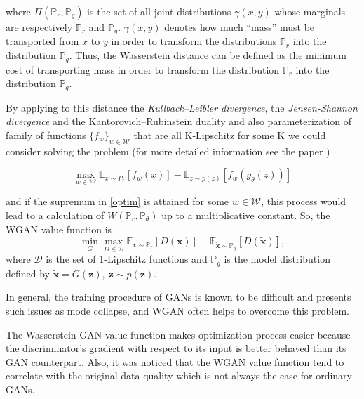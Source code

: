 \documentclass{webofc}
\newcommand{\vx}{\ensuremath{\mathbf{x}}}
\newcommand{\vz}{\ensuremath{\mathbf{z}}}
\begin{document}
where $\Pi(\mathbb{P}_r, \mathbb{P}_g)$ is the set of all joint distributions $\gamma(x, y)$ whose marginals are respectively $\mathbb{P}_r$ and $\mathbb{P}_g$. $\gamma(x, y)$ denotes how much “mass” must be transported from $x$ to $y$ in order to transform the distributions $\mathbb{P}_r$ into the distribution $\mathbb{P}_g$. Thus, the Wasserstein distance can be defined as the minimum cost of transporting mass in order to transform the distribution $\mathbb{P}_r$ into the distribution $\mathbb{P}_q$. 

By applying to this distance the \emph{Kullback--Leibler divergence}, the \emph{Jensen-Shannon divergence} and the Kantorovich--Rubinstein duality and also parameterization of family of functions $\{f_w\}_{w \in \mathcal{W}}$ that are all K-Lipschitz for some K we could consider solving the problem (for more detailed information see the paper \cite{arjovsky2017wasserstein})

\begin{equation}\label{optim}
\max_{w \in \mathcal{W}} \mathbb{E}_{x \sim P_r}[f_w(x)] - \mathbb{E}_{z\sim p(z)} [f_w(g_\theta(z))]
\end{equation}

and if the supremum in \eqref{optim} is attained for some $w \in \mathcal{W}$, this process would lead to a calculation of $W(\mathbb{P}_r, \mathbb{P}_\theta)$ up to a multiplicative constant.
So, the WGAN value function is
\begin{equation}\label{wgan_loss}
\min_G \max_{D \in \mathcal{D}}  \mathbb{E}_{\vx \sim \mathbb{P}_r}  [D(\vx)] - \mathbb{E}_{\tilde{\vx} \sim \mathbb{P}_g} [D(\tilde{\vx})],
\end{equation}
where $\mathcal{D}$ is the set of 1-Lipschitz functions and $\mathbb{P}_g$ is  the model distribution defined by $\tilde{\vx} = G(\vz), ~\vz \sim p(\vz).$

In general, the training procedure of GANs is known to be difficult and presents such issues as mode collapse, and WGAN often helps to overcome this problem.

The Wasserstein GAN value function makes optimization process easier because the discriminator's gradient with respect to its input is better behaved than its GAN counterpart. Also, it was noticed that the WGAN value function tend to correlate with the original data quality which is not always the case for ordinary GANs.
\end{document}
